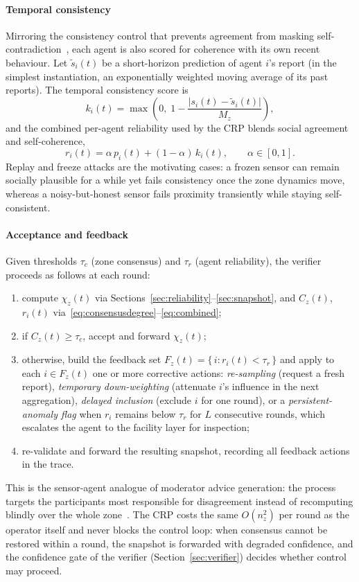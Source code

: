 \documentclass[preprint,11pt]{elsarticle}
\begin{document}
\paragraph{Temporal consistency}
Mirroring the consistency control that prevents agreement from masking
self-contradiction~\cite{herreraviedma2007,cabrerizo2010kbs}, each agent
is also scored for coherence with its own recent behaviour. Let
$\tilde{s}_i(t)$ be a short-horizon prediction of agent $i$'s report
(in the simplest instantiation, an exponentially weighted moving
average of its past reports). The temporal consistency score is
\begin{equation}
k_i(t)=\max\!\left(0,\;1-\frac{\lvert s_i(t)-\tilde{s}_i(t)\rvert}
{M_z}\right),
\label{eq:consistency}
\end{equation}
and the combined per-agent reliability used by the CRP blends social
agreement and self-coherence,
\begin{equation}
r_i(t)=\alpha\, p_i(t) + (1-\alpha)\, k_i(t),
\qquad \alpha\in[0,1].
\label{eq:combined}
\end{equation}
Replay and freeze attacks are the motivating cases: a frozen sensor can
remain socially plausible for a while yet fails consistency once the
zone dynamics move, whereas a noisy-but-honest sensor fails proximity
transiently while staying self-consistent.

\paragraph{Acceptance and feedback}
Given thresholds $\tau_c$ (zone consensus) and $\tau_r$ (agent
reliability), the verifier proceeds as follows at each round:
\begin{enumerate}
\item compute $\chi_z(t)$ via
Sections~\ref{sec:reliability}--\ref{sec:snapshot}, and
$C_z(t)$, $r_i(t)$ via~\eqref{eq:consensusdegree}--\eqref{eq:combined};
\item if $C_z(t)\geq\tau_c$, accept and forward $\chi_z(t)$;
\item otherwise, build the feedback set
$F_z(t)=\{\,i : r_i(t)<\tau_r\,\}$ and apply to each $i\in F_z(t)$ one
or more corrective actions:
\emph{re-sampling} (request a fresh report),
\emph{temporary down-weighting} (attenuate $i$'s influence in the next
aggregation),
\emph{delayed inclusion} (exclude $i$ for one round), or a
\emph{persistent-anomaly flag} when $r_i$ remains below $\tau_r$ for
$L$ consecutive rounds, which escalates the agent to the facility layer
for inspection;
\item re-validate and forward the resulting snapshot, recording all
feedback actions in the trace.
\end{enumerate}
This is the sensor-agent analogue of moderator advice generation: the
process targets the participants most responsible for disagreement
instead of recomputing blindly over the whole
zone~\cite{cabrerizo2009,cabrerizo2010kbs}. The CRP costs the same
$O(n_z^2)$ per round as the operator itself and never blocks the
control loop: when consensus cannot be restored within a round, the
snapshot is forwarded with degraded confidence, and the confidence
gate of the verifier (Section~\ref{sec:verifier}) decides whether
control may proceed.
\end{document}
